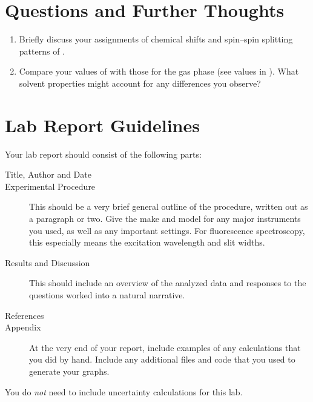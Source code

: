 
\section{Questions and Further Thoughts} %
\label{sec:questions_and_further_thoughts}

\begin{enumerate}
	\item Briefly discuss your assignments of chemical shifts and spin--spin splitting patterns of . 
	\item Compare your values of  with those for the gas phase (see values in \textcite{jarek97nmr}).
	What solvent properties might account for any differences you observe?
\end{enumerate}


\section{Lab Report Guidelines} %
\label{sec:lab_report_guidelines}

Your lab report should consist of the following parts:
\begin{description}
	\item[Title, Author and Date]
	\item[Experimental Procedure] This should be a very brief general outline of the procedure, written out as a paragraph or two. Give the make and model for any major instruments you used, as well as any important settings. For fluorescence spectroscopy, this especially means the excitation wavelength and slit widths.
	\item[Results and Discussion] This should include an overview of the analyzed data and responses to the questions worked into a natural narrative.
	\item[References]
	\item[Appendix] At the very end of your report, include examples of any calculations that you did by hand. 
	Include any additional files and code that you used to generate your graphs.
\end{description}

\noindent You do \emph{not} need to include uncertainty calculations for this lab. 

